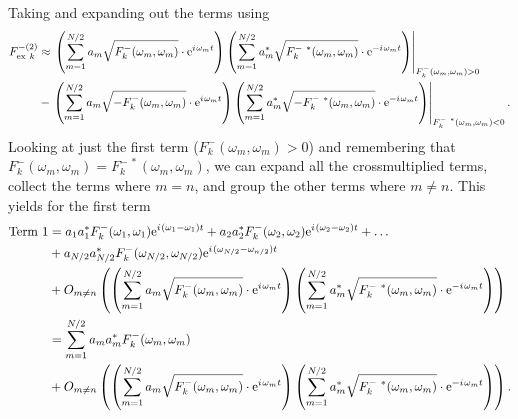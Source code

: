 Taking  and expanding out the terms using 
\begin{align}
   {F_{\text{ex}~k}^{- (2)}} &\approx 
            \left.   \left( \sum\limits_{m=1}^{N/2}
                        {a_m} \sqrt{   F_k^{-}(\omega_m,\omega_m)}
                        \cdot \mathrm{e}^{{i\mkern1.5mu} \omega_m t} \right)
                     \left( \sum\limits_{m=1}^{N/2}
                        {a_m^*} \sqrt{   F_k^{-~*}(\omega_m,\omega_m)}
                        \cdot \mathrm{e}^{- {i\mkern1.5mu} \omega_m t} \right)
              \right|_{F_{k}^{-}(\omega_m,\omega_m) > 0} \nonumber\\
         &-  \left.  \left( \sum\limits_{m=1}^{N/2}
                        {a_m} \sqrt{  -F_k^{-}(\omega_m,\omega_m)}
                        \cdot \mathrm{e}^{{i\mkern1.5mu} \omega_m t} \right)
                     \left( \sum\limits_{m=1}^{N/2}
                        {a_m^*} \sqrt{  -F_k^{-~*}(\omega_m,\omega_m)}
                        \cdot \mathrm{e}^{- {i\mkern1.5mu} \omega_m t} \right)
              \right|_{F_{k}^{-~*}(\omega_m,\omega_m) < 0}.
\label{eq:NewmanRevised2}
\end{align}
Looking at just the first term (${F_{k}^{-}(\omega_m,\omega_m) > 0}$) and remembering that $F_k^{-}(\omega_m,\omega_m) = F_k^{-~*}(\omega_m,\omega_m)$, we can expand all the crossmultiplied terms, collect the terms where $m=n$, and group the other terms where $m \ne n$.  This yields for the first term
\begin{align}
   \text{Term 1} &=  {a_1}{a_1^*} F_k^{-}(\omega_1,\omega_1) \mathrm{e}^{{i\mkern1.5mu} (\omega_1 - \omega_1) t} +
                     {a_2}{a_2^*} F_k^{-}(\omega_2,\omega_2) \mathrm{e}^{{i\mkern1.5mu} (\omega_2 - \omega_2) t} + \ldots \nonumber\\
                 &+  {a_{N/2}}{a_{N/2}^*} F_k^{-}(\omega_{N/2},\omega_{N/2}) \mathrm{e}^{{i\mkern1.5mu} (\omega_{N/2} - \omega_{n/2}) t} \nonumber\\
                 &+  O_{m \ne n}\left(
                        \left(\sum\limits_{m=1}^{N/2}
                        {a_m} \sqrt{   F_k^{-}(\omega_m,\omega_m)}
                        \cdot \mathrm{e}^{{i\mkern1.5mu} \omega_m t} \right)
                     \left( \sum\limits_{m=1}^{N/2}
                        {a_m^*} \sqrt{   F_k^{-~*}(\omega_m,\omega_m)}
                        \cdot \mathrm{e}^{- {i\mkern1.5mu} \omega_m t} \right)\right) \nonumber\\
                 &= \sum\limits_{m=1}^{N/2} {a_m} {a_m^*} F_k^{-}(\omega_m,\omega_m) \nonumber\\
                 &+  O_{m \ne n}\left(
                        \left(\sum\limits_{m=1}^{N/2}
                        {a_m} \sqrt{   F_k^{-}(\omega_m,\omega_m)}
                        \cdot \mathrm{e}^{{i\mkern1.5mu} \omega_m t} \right)
                     \left( \sum\limits_{m=1}^{N/2}
                        {a_m^*} \sqrt{   F_k^{-~*}(\omega_m,\omega_m)}
                        \cdot \mathrm{e}^{- {i\mkern1.5mu} \omega_m t} \right)\right).
\label{eq:NewmanRevised2t1}
\end{align}
